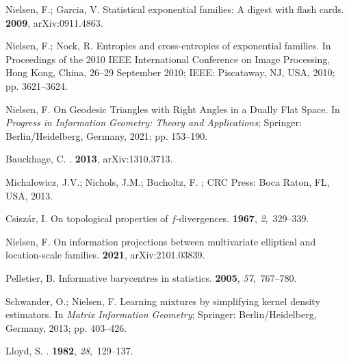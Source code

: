 \documentclass[entropy,article,accept,oneauthor,pdftex,entropy]{Definitions/mdpi}
\begin{document}
\begin{thebibliography}{999}
Nielsen, F.; Garcia, V.
\newblock Statistical exponential families: A digest with flash cards.
 {\bf 2009}, arXiv:0911.4863.

Nielsen, F.; Nock, R.
\newblock Entropies and cross-entropies of exponential families.
\newblock  In Proceedings of the 2010 IEEE International Conference on Image Processing, {Hong Kong, China, 26--29 September} 2010; 
IEEE: {Piscataway, NJ, USA},  2010;
  pp. 3621--3624.

Nielsen, F.
\newblock On Geodesic Triangles with Right Angles in a Dually Flat Space.
\newblock In {\em Progress in Information Geometry: Theory and Applications}; {Springer:  Berlin/Heidelberg, Germany,} 
 {2021}; pp. 153--190.

Bauckhage, C.
.
 {\bf 2013}, arXiv:1310.3713.

Michalowicz, J.V.; Nichols, J.M.; Bucholtz, F.
; CRC Press:  {Boca Raton, FL, USA,}
  2013.

Csisz{\'a}r, I.
\newblock On topological properties of $f$-divergences.
 {\bf 1967}, {\em 2},~329--339.

Nielsen, F.
\newblock On information projections between multivariate elliptical and
  location-scale families.
 {\bf 2021}, arXiv:2101.03839.

Pelletier, B.
\newblock Informative barycentres in statistics.
 {\bf 2005},
  {\em 57},~767--780.

Schwander, O.; Nielsen, F.
\newblock Learning mixtures by simplifying kernel density estimators. In {\em
  Matrix Information Geometry}; Springer:  {Berlin/Heidelberg, Germany},  2013; pp. 403--426.

Lloyd, S.
.
 {\bf 1982}, {\em
  28},~129--137.


\end{thebibliography}
\end{document}
